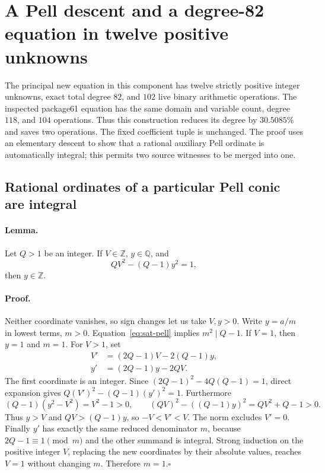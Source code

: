 \section{A Pell descent and a degree-82 equation in twelve positive unknowns}
\label{sec:pell-saturation}

The principal new equation in this component has twelve strictly positive
integer unknowns, exact total degree $82$, and $102$ live binary arithmetic
operations.  The inspected package61 equation has the same domain and
variable count, degree $118$, and $104$ operations.  Thus this construction
reduces its degree by $30.5085\%$ and saves two operations.  The fixed
coefficient tuple is unchanged.  The proof uses an elementary descent to
show that a rational auxiliary Pell ordinate is automatically integral;
this permits two source witnesses to be merged into one.

\subsection{Rational ordinates of a particular Pell conic are integral}

\paragraph{Lemma.}
Let $Q>1$ be an integer.  If $V\in\mathbb Z$, $y\in\mathbb Q$, and
\begin{equation}
 QV^2-(Q-1)y^2=1,                                      \label{eq:sat-pell}
\end{equation}
then $y\in\mathbb Z$.

\paragraph{Proof.}
Neither coordinate vanishes, so sign changes let us take $V,y>0$.
Write $y=a/m$ in lowest terms, $m>0$.  Equation~\eqref{eq:sat-pell}
implies $m^2\mid Q-1$.  If $V=1$, then $y=1$ and $m=1$.
For $V>1$, set
\begin{align}
 V'&=(2Q-1)V-2(Q-1)y,\nonumber\\
 y'&=(2Q-1)y-2QV.                                      \label{eq:sat-step}
\end{align}
The first coordinate is an integer.  Since
$(2Q-1)^2-4Q(Q-1)=1$, direct expansion gives
$Q(V')^2-(Q-1)(y')^2=1$.  Furthermore
\[
 (Q-1)(y^2-V^2)=V^2-1>0,
 \qquad
 (QV)^2-((Q-1)y)^2=QV^2+Q-1>0.
\]
Thus $y>V$ and $QV>(Q-1)y$, so $-V<V'<V$.
The norm excludes $V'=0$.  Finally $y'$ has exactly the same reduced
denominator $m$, because $2Q-1\equiv1\pmod m$ and the other summand is
integral.  Strong induction on the positive integer $V$, replacing the
new coordinates by their absolute values, reaches $V=1$ without changing
$m$.  Therefore $m=1$.\hfill$\square$

